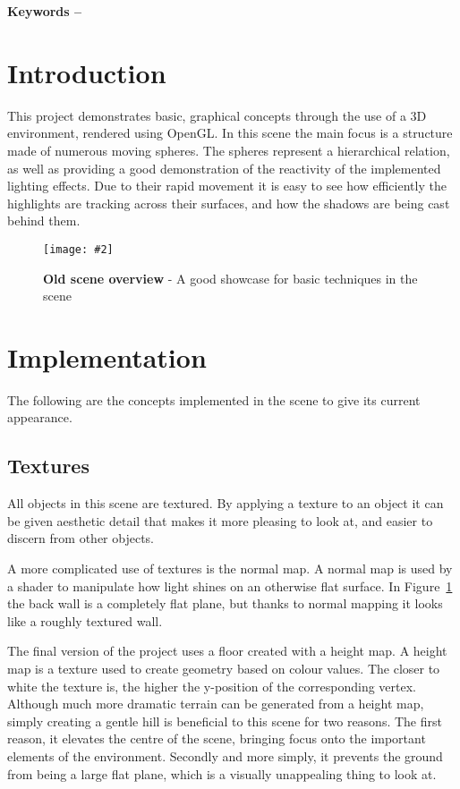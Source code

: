 \documentclass[10pt, a4paper]{article}
\title{\mytitle}
\author{\myauthor\hspace{1em}\\\contact\\Edinburgh Napier University\hspace{0.5em}-\hspace{0.5em}\mymodule}
\date{}
\newcommand{\figuremacro}[5]{
    \begin{figure}[#1]
        \centering
        \texttt{[image: \#2]}
        \caption[#3]{\textbf{#3}#4}
        \label{fig:#2}
    \end{figure}
}
\begin{document}
	\maketitle
	\begin{abstract}
		This is a project which demonstrates the implementation of basic lighting, shadowing, and texturing effects, in a 3D graphical scene.
	\end{abstract}
    
	\textbf{Keywords -- }{\mykeywords}
	\section{Introduction}
	This project demonstrates basic, graphical concepts through the use of a 3D environment, rendered using OpenGL.  In this scene the main focus is a structure made of numerous moving spheres.  The spheres represent a hierarchical relation, as well as providing a good demonstration of the reactivity of the implemented lighting effects.  Due to their rapid movement it is easy to see how efficiently the highlights are tracking across their surfaces, and how the shadows are being cast behind them.
    
    \figuremacro{h}{basic_scene}{Old scene overview}{ - A good showcase for basic techniques in the scene}{1.0}
	
	\section{Implementation}
	The following are the concepts implemented in the scene to give its current appearance.
	\subsection{Textures}
	All objects in this scene are textured.  By applying a texture to an object it can be given aesthetic detail that makes it more pleasing to look at, and easier to discern from other objects.
	
	A more complicated use of textures is the normal map.  A normal map is used by a shader to manipulate how light shines on an otherwise flat surface.  In Figure~\ref{fig:basic_scene} the back wall is a completely flat plane, but thanks to normal mapping it looks like a roughly textured wall.
	
	The final version of the project uses a floor created with a height map.  A height map is a texture used to create geometry based on colour values.  The closer to white the texture is, the higher the y-position of the corresponding vertex.  Although much more dramatic terrain can be generated from a height map, simply creating a gentle hill is beneficial to this scene for two reasons.  The first reason, it elevates the centre of the scene, bringing focus onto the important elements of the environment.  Secondly and more simply, it prevents the ground from being a large flat plane, which is a visually unappealing thing to look at.
	
\end{document}
